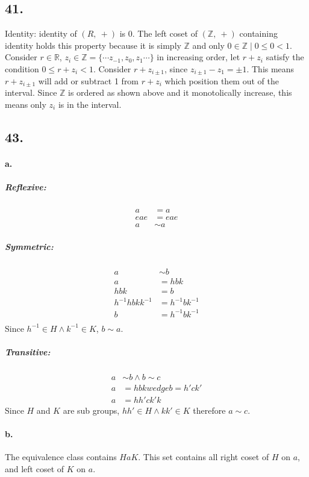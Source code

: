 \documentclass{article}
\begin{document}
\subsection*{41. }
Identity: identity of $(R,\ +)$ is 0. The left coset of $(\mathbb{Z},\ +)$
containing identity holds this property because it is simply $\mathbb{Z}$ and
only $0 \in \mathbb{Z} \mid 0 \le 0 < 1$.\\
Consider $r \in \mathbb{R}$, $z_i \in \mathbb{Z} = \{\cdots z_{-1}, z_0,
z_1 \cdots\}$ in increasing order, let $r+z_i$ satisfy the condition $0 \le r+z_i
< 1$. Consider $r + z_{i\pm 1}$, since $z_{i\pm 1} - z_1 = \pm 1$. This means
$r+z_{i \pm 1}$ will add or subtract 1 from $r+z_i$ which position them out of
the interval. Since $\mathbb{Z}$ is ordered as shown above and it monotolically increase,
this means only $z_i$ is in the interval.

\subsection*{43. }
\paragraph{a. }
\subparagraph{Reflexive: }
	\begin{align*}
			a &= a \\
		eae &= eae \\
			a &\sim a
	\end{align*}
\subparagraph{Symmetric: }
	\begin{align*}
			a &\sim b \\
			a &= hbk \\
	  hbk &= b \\
		h^{-1}hbkk^{-1} &= h^{-1}bk^{-1} \\
		  b &= h^{-1}bk^{-1} \\
	\end{align*}
	Since $h^{-1} \in H \wedge k^{-1} \in K$, $b \sim a$.
\subparagraph{Transitive: }
	\begin{align*}
			a &\sim b \wedge b \sim c \\
			a &= hbk wedge b=h'ck' \\
			a &= hh'ck'k
	\end{align*}
Since $H$ and $K$ are sub groups, $hh' \in H \wedge kk' \in K$ therefore $a \sim
c$.
\paragraph{b. }The equivalence class contains $HaK$. This set contains all right
coset of $H$ on $a$, and left coset of $K$ on $a$.
\end{document}
